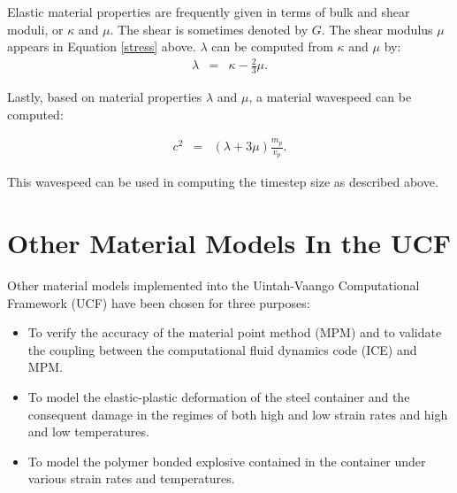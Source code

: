 Elastic material properties are frequently given in terms of 
bulk and shear moduli, or $\kappa$ and $\mu$.  The shear is 
sometimes denoted by $G$.  The shear modulus $\mu$ appears in 
Equation \ref{stress} above.  $\lambda$ can be computed from
$\kappa$ and $\mu$ by:
\begin{eqnarray}
	\lambda &=& \kappa - \frac{2}{3}\mu.
\end{eqnarray}

Lastly, based on material properties $\lambda$ and $\mu$, a material 
wavespeed can be computed:

\begin{eqnarray}
	c^2 &=& (\lambda + 3 \mu)\frac{m_p}{v_p}.
\end{eqnarray}

This wavespeed can be used in computing the timestep size as 
described above.

\section{Other Material Models In the UCF}
Other material models implemented into the Uintah-Vaango Computational
Framework (UCF) have been chosen for three purposes:
\begin{itemize}
  \item To verify the accuracy of the material point method (MPM)
        and to validate the coupling between the computational fluid 
        dynamics code (ICE) and MPM.
  \item To model the elastic-plastic deformation of the steel
        container and the consequent damage in the regimes of 
        both high and low strain rates and high and low temperatures.
  \item To model the polymer bonded explosive contained in the 
        container under various strain rates and temperatures.
\end{itemize}

